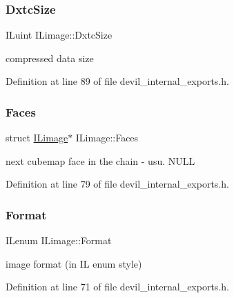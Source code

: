 \mbox{\label{structILimage_a5d423e11ee4e5076d92f6a7e863b2070}} 
\subsubsection{\texorpdfstring{Dxtc\+Size}{DxtcSize}}
{\footnotesize\ttfamily I\+Luint I\+Limage\+::\+Dxtc\+Size}



compressed data size 



Definition at line 89 of file devil\+\_\+internal\+\_\+exports.\+h.

\mbox{\label{structILimage_a42b8f93f02ab5e6c9623967a08e2d013}} 
\subsubsection{\texorpdfstring{Faces}{Faces}}
{\footnotesize\ttfamily struct \hyperlink{structILimage}{I\+Limage}$\ast$ I\+Limage\+::\+Faces}



next cubemap face in the chain -\/ usu. N\+U\+LL 



Definition at line 79 of file devil\+\_\+internal\+\_\+exports.\+h.

\mbox{\label{structILimage_af36941d08ffdd7ed7c42cdb11d2a5513}} 
\subsubsection{\texorpdfstring{Format}{Format}}
{\footnotesize\ttfamily I\+Lenum I\+Limage\+::\+Format}



image format (in IL enum style) 



Definition at line 71 of file devil\+\_\+internal\+\_\+exports.\+h.

\mbox{\label{structILimage_af0fe112b929d774c723ba5d8b6c2c5da}} 
